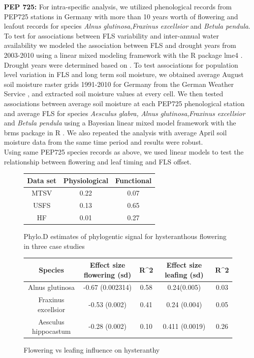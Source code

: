 \documentclass[12pt]{article}\usepackage[]{graphicx}\usepackage[]{color}
\begin{document}
\indent \textbf{PEP 725:} For intra-specific analysis, we utilized phenological records from PEP725 stations in Germany with more than 10 years worth of flowering and leafout records \citep{PEP725} for species \textit{Alnus glutinosa},\textit{Fraxinus excellsior} and \textit {Betula pendula}. To test for associations between FLS variability and inter-annual water availability we modeled the association between FLS and drought years from 2003-2010 using a linear mixed modeling framework with the R package lme4 \citep{Bates2014}. Drought years were determined based on \citet{Ivits_2013}. To test associations for population level variation in FLS and long term soil moisture, we obtained average August soil moisture raster grids 1991-2010 for Germany from the German Weather Service \citep{DWD}, and extracted soil moisture values at every cell. We then tested associations between average soil moisture at each PEP725 phenological station and average FLS for species \textit{Aesculus glabra,} \textit{Alnus glutinosa},\textit{Fraxinus excellsior} and \textit {Betula pendula} using a Bayesian linear mixed model framework with the brms package in R \citep{Burkner2018}. We also repeated the analysis with average April soil moisture data from the same time period and results were robust.\\
\indent Using same PEP725 species records as above, we used linear models to test the relationship between flowering and leaf timing and FLS offset.\\


\begin{figure}[h!]
\begin{tabular}[width=\textwidth]{|c|c|c|}
\hline
Data set&Physiological&Functional\\
\hline
MTSV&0.22&0.07\\
USFS&0.13&0.65\\
HF&0.01&0.27\\
\hline
\end{tabular}
\caption{Phylo.D estimates of phylogentic signal for hysteranthous flowering in three case studies}
\label{fig:Figure S1}
\end{figure}

\begin{figure}[h!]
\begin{tabular}[width=\textwidth]{|c|c|c|c|c|}
\hline
Species&Effect size flowering (sd)&R^2&Effect size leafing (sd)&R^2\\
\hline
Alnus glutinosa&-0.67 (0.002314) &0.58&0.24(0.005)&0.03\\
Fraxinus excellsior&-0.53 (0.002)&0.41&0.24 (0.004)&0.05\\
Aesculus hippocastum& -0.28 (0.002)&0.10&0.411 (0.0019)&0.26 \\
\hline
\end{tabular}
    \caption{Flowering vs leafing influence on hysteranthy}
    \label{fig:Figure S2}
    \end{figure}
\end{document}
